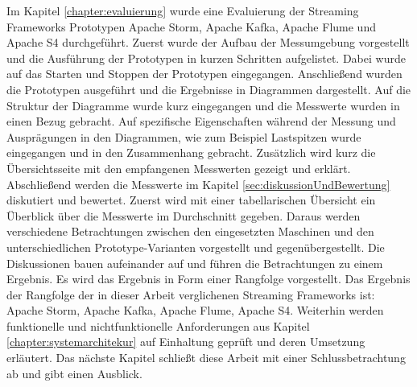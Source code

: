 Im Kapitel \ref{chapter:evaluierung} wurde eine Evaluierung der Streaming Frameworks Prototypen Apache Storm, Apache Kafka, Apache Flume und Apache S4 durchgeführt. Zuerst wurde der Aufbau der Messumgebung vorgestellt und die Ausführung der Prototypen in kurzen Schritten aufgelistet. Dabei wurde auf das Starten und Stoppen der Prototypen eingegangen. Anschließend wurden die Prototypen ausgeführt und die Ergebnisse in Diagrammen dargestellt. Auf die Struktur der Diagramme wurde kurz eingegangen und die Messwerte wurden in einen Bezug gebracht. Auf spezifische Eigenschaften während der Messung und Ausprägungen in den Diagrammen, wie zum Beispiel Lastspitzen wurde eingegangen und in den Zusammenhang gebracht. Zusätzlich wird kurz die Übersichtsseite mit den empfangenen Messwerten gezeigt und erklärt. Abschließend werden die Messwerte im Kapitel \ref{sec:diskussionUndBewertung} diskutiert und bewertet. Zuerst wird mit einer tabellarischen Übersicht ein Überblick über die Messwerte im Durchschnitt gegeben. Daraus werden verschiedene Betrachtungen zwischen den eingesetzten Maschinen und den unterschiedlichen Prototype-Varianten vorgestellt und gegenübergestellt. Die Diskussionen bauen aufeinander auf und führen die Betrachtungen zu einem Ergebnis. Es wird das Ergebnis in Form einer Rangfolge vorgestellt. Das Ergebnis der Rangfolge der in dieser Arbeit verglichenen Streaming Frameworks ist: Apache Storm, Apache Kafka, Apache Flume, Apache S4. Weiterhin werden funktionelle und nichtfunktionelle Anforderungen aus Kapitel \ref{chapter:systemarchitekur} auf Einhaltung geprüft und deren Umsetzung erläutert. Das nächste Kapitel schließt diese Arbeit mit einer Schlussbetrachtung ab und gibt einen Ausblick.